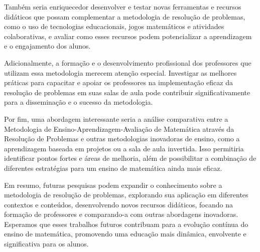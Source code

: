 Também seria enriquecedor desenvolver e testar novas ferramentas e recursos didáticos que possam complementar a metodologia de resolução de problemas, como o uso de tecnologias educacionais, jogos matemáticos e atividades colaborativas, e avaliar como esses recursos podem potencializar a aprendizagem e o engajamento dos alunos.

Adicionalmente, a formação e o desenvolvimento profissional dos professores que utilizam essa metodologia merecem atenção especial. Investigar as melhores práticas para capacitar e apoiar os professores na implementação eficaz da resolução de problemas em suas salas de aula pode contribuir significativamente para a disseminação e o sucesso da metodologia.

Por fim, uma abordagem interessante seria a análise comparativa entre a Metodologia de Ensino-Aprendizagem-Avaliação de Matemática através da Resolução de Problemas e outras metodologias inovadoras de ensino, como a aprendizagem baseada em projetos ou a sala de aula invertida. Isso permitiria identificar pontos fortes e áreas de melhoria, além de possibilitar a combinação de diferentes estratégias para um ensino de matemática ainda mais eficaz.

Em resumo, futuras pesquisas podem expandir o conhecimento sobre a metodologia de resolução de problemas, explorando sua aplicação em diferentes contextos e conteúdos, desenvolvendo novos recursos didáticos, focando na formação de professores e comparando-a com outras abordagens inovadoras. Esperamos que esses trabalhos futuros contribuam para a evolução contínua do ensino de matemática, promovendo uma educação mais dinâmica, envolvente e significativa para os alunos.



\postextual







